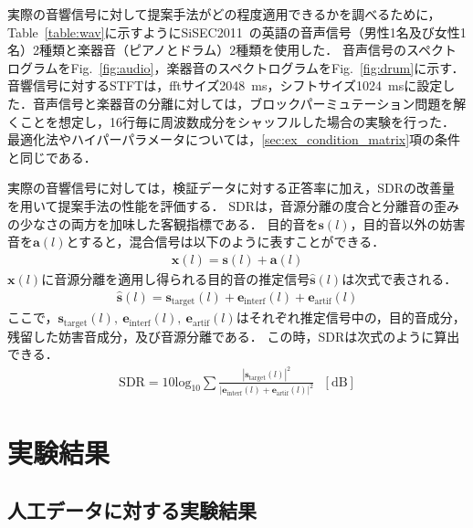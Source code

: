 実際の音響信号に対して提案手法がどの程度適用できるかを調べるために，Table~\ref{table:wav}に示すようにSiSEC2011~\cite{Sisec}の英語の音声信号（男性1名及び女性1名）2種類と楽器音（ピアノとドラム）2種類を使用した．
音声信号のスペクトログラムをFig.~\ref{fig:audio}，楽器音のスペクトログラムをFig.~\ref{fig:drum}に示す．
音響信号に対するSTFTは，fftサイズ2048~ms，シフトサイズ1024~msに設定した．音声信号と楽器音の分離に対しては，ブロックパーミュテーション問題を解くことを想定し，16行毎に周波数成分をシャッフルした場合の実験を行った．
最適化法やハイパーパラメータについては，\ref{sec:ex_condition_matrix}項の条件と同じである．

実際の音響信号に対しては，検証データに対する正答率に加え，SDRの改善量を用いて提案手法の性能を評価する．
SDRは，音源分離の度合と分離音の歪みの少なさの両方を加味した客観指標である．
目的音を$\bm{s}(l)$，目的音以外の妨害音を$\bm{a}(l)$とすると，混合信号は以下のように表すことができる．
\begin{align}
    \bm{x}(l) = \bm{s}(l) + \bm{a}(l)
\end{align}
$\bm{x}(l)$に音源分離を適用し得られる目的音の推定信号$\bm{\hat{s}}(l)$は次式で表される．
\begin{align}
    \bm{\hat{s}}(l) = \bm{s}_{\mathrm{target}}(l) + \bm{e}_{\mathrm{interf}}(l) + \bm{e}_{\mathrm{artif}}(l)
\end{align}
ここで，$\bm{s}_{\mathrm{target}}(l),~\bm{e}_{\mathrm{interf}}(l),~\bm{e}_{\mathrm{artif}}(l)$はそれぞれ推定信号中の，目的音成分，残留した妨害音成分，及び音源分離である．
この時，SDRは次式のように算出できる．
\begin{align}
    \mathrm{SDR} = 10 \mathrm{log}_{10} \sum \frac{|\bm{s}_{\mathrm{target}}(l)|^2}{|\bm{e}_{\mathrm{interf}}(l) + \bm{e}_{\mathrm{artif}}(l)|^2}~~~\mathrm{[dB]}
\end{align}
\section{実験結果}
\label{sec:ex_res}
\subsection{人工データに対する実験結果}
\label{sec:ex_res_artificial}


